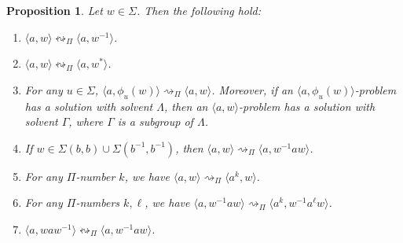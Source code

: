 \documentclass[10pt,a4paper]{amsart}
\newtheorem{proposition}[theorem]{Proposition}
\theoremstyle{definition}
\theoremstyle{definition}
\numberwithin{equation}{section}
\begin{document}
\begin{proposition}\label{prop:awbasic} Let $w\in \Sigma$. Then the following hold:
\begin{enumerate}
\item[\rm (i)] $\langle a, w\rangle\leftrightsquigarrow_{\Pi}\langle a, w^{-1}\rangle$.
\item[\rm (ii)] $\langle a, w\rangle\leftrightsquigarrow_{\Pi}\langle a, w^*\rangle$.
\item[\rm (iii)] For any $u\in \Sigma$, $\langle a, \phi_u(w)\rangle\rightsquigarrow_{\Pi} \langle a, w\rangle$. Moreover, if an $\langle a, \phi_u(w)\rangle$-problem has a solution with solvent $\Lambda$, then an $\langle a, w\rangle$-problem has a solution with solvent $\Gamma$, where $\Gamma$ is a subgroup of $\Lambda$.
\item[\rm (iv)] If $w\in \Sigma(b, b)\cup \Sigma(b^{-1}, b^{-1})$, then $ \langle a, w\rangle \rightsquigarrow_{\Pi} \langle a, w^{-1}aw\rangle$.
\item[\rm (v)] For any $\Pi$-number $k$, we have $\langle a, w\rangle\rightsquigarrow_{\Pi}\langle a^k, w\rangle$.
\item[\rm (vi)] For any $\Pi$-numbers $k, \ell$, we have $\langle a,w^{-1}aw\rangle\rightsquigarrow_{\Pi}\langle a^k, w^{-1}a^\ell w\rangle$.
\item[\rm (vii)] $\langle a, waw^{-1}\rangle\leftrightsquigarrow_{\Pi}\langle a, w^{-1}aw\rangle$.
\end{enumerate}
\end{proposition}
\end{document}
